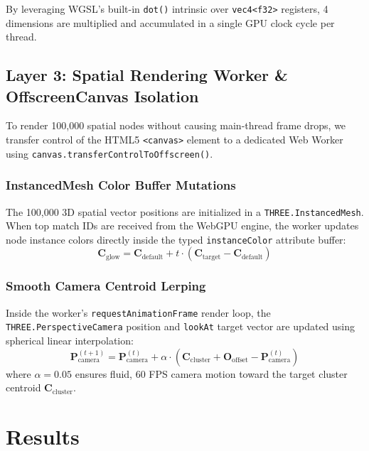 \documentclass[fleqn,10pt,lineno]{wlpeerj}
\begin{document}
By leveraging WGSL's built-in \texttt{dot()} intrinsic over \texttt{vec4<f32>} registers, 4 dimensions are multiplied and accumulated in a single GPU clock cycle per thread.

\subsection*{Layer 3: Spatial Rendering Worker \& OffscreenCanvas Isolation}

To render 100,000 spatial nodes without causing main-thread frame drops, we transfer control of the HTML5 \texttt{<canvas>} element to a dedicated Web Worker using \texttt{canvas.transferControlToOffscreen()}.

\subsubsection*{InstancedMesh Color Buffer Mutations}
The 100,000 3D spatial vector positions are initialized in a \texttt{THREE.InstancedMesh}. When top match IDs are received from the WebGPU engine, the worker updates node instance colors directly inside the typed \texttt{instanceColor} attribute buffer:
\begin{equation}
\mathbf{C}_{\text{glow}} = \mathbf{C}_{\text{default}} + t \cdot (\mathbf{C}_{\text{target}} - \mathbf{C}_{\text{default}})
\label{eq:color_lerp}
\end{equation}

\subsubsection*{Smooth Camera Centroid Lerping}
Inside the worker's \texttt{requestAnimationFrame} render loop, the \texttt{THREE.PerspectiveCamera} position and \texttt{lookAt} target vector are updated using spherical linear interpolation:
\begin{equation}
\mathbf{P}_{\text{camera}}^{(t+1)} = \mathbf{P}_{\text{camera}}^{(t)} + \alpha \cdot \left( \mathbf{C}_{\text{cluster}} + \mathbf{O}_{\text{offset}} - \mathbf{P}_{\text{camera}}^{(t)} \right)
\label{eq:camera_lerp}
\end{equation}
where $\alpha = 0.05$ ensures fluid, 60 FPS camera motion toward the target cluster centroid $\mathbf{C}_{\text{cluster}}$.

\section*{Results}
\end{document}
